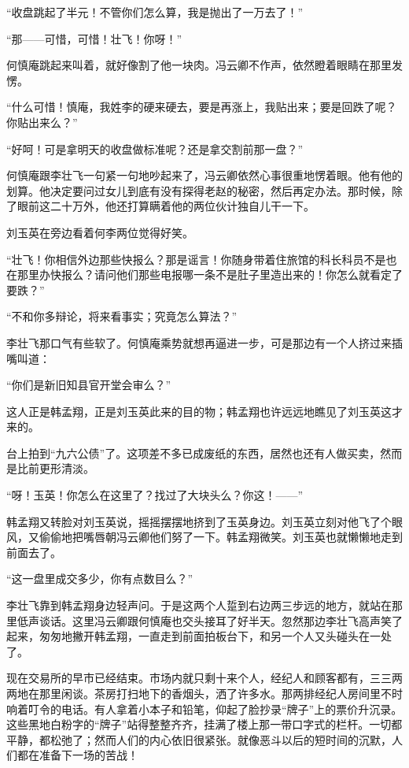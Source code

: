 \par “收盘跳起了半元！不管你们怎么算，我是抛出了一万去了！”
\par “那——可惜，可惜！壮飞！你呀！”
\par 何慎庵跳起来叫着，就好像割了他一块肉。冯云卿不作声，依然瞪着眼睛在那里发愣。
\par “什么可惜！慎庵，我姓李的硬来硬去，要是再涨上，我贴出来；要是回跌了呢？你贴出来么？”
\par “好呵！可是拿明天的收盘做标准呢？还是拿交割前那一盘？”
\par 何慎庵跟李壮飞一句紧一句地吵起来了，冯云卿依然心事很重地愣着眼。他有他的划算。他决定要问过女儿到底有没有探得老赵的秘密，然后再定办法。那时候，除了眼前这二十万外，他还打算瞒着他的两位伙计独自儿干一下。
\par 刘玉英在旁边看着何李两位觉得好笑。
\par “壮飞！你相信外边那些快报么？那是谣言！你随身带着住旅馆的科长科员不是也在那里办快报么？请问他们那些电报哪一条不是肚子里造出来的！你怎么就看定了要跌？”
\par “不和你多辩论，将来看事实；究竟怎么算法？”
\par 李壮飞那口气有些软了。何慎庵乘势就想再逼进一步，可是那边有一个人挤过来插嘴叫道：
\par “你们是新旧知县官开堂会审么？”
\par 这人正是韩孟翔，正是刘玉英此来的目的物；韩孟翔也许远远地瞧见了刘玉英这才来的。
\par 台上拍到“九六公债”了。这项差不多已成废纸的东西，居然也还有人做买卖，然而是比前更形清淡。
\par “呀！玉英！你怎么在这里了？找过了大块头么？你这！——”
\par 韩孟翔又转脸对刘玉英说，摇摇摆摆地挤到了玉英身边。刘玉英立刻对他飞了个眼风，又偷偷地把嘴唇朝冯云卿他们努了一下。韩孟翔微笑。刘玉英也就懒懒地走到前面去了。
\par “这一盘里成交多少，你有点数目么？”
\par 李壮飞靠到韩孟翔身边轻声问。于是这两个人踅到右边两三步远的地方，就站在那里低声谈话。这里冯云卿跟何慎庵也交头接耳了好半天。忽然那边李壮飞高声笑了起来，匆匆地撇开韩孟翔，一直走到前面拍板台下，和另一个人又头碰头在一处了。
\par 现在交易所的早市已经结束。市场内就只剩十来个人，经纪人和顾客都有，三三两两地在那里闲谈。茶房打扫地下的香烟头，洒了许多水。那两排经纪人房间里不时响着叮令的电话。有人拿着小本子和铅笔，仰起了脸抄录“牌子”上的票价升沉录。这些黑地白粉字的“牌子”站得整整齐齐，挂满了楼上那一带口字式的栏杆。一切都平静，都松弛了；然而人们的内心依旧很紧张。就像恶斗以后的短时间的沉默，人们都在准备下一场的苦战！
